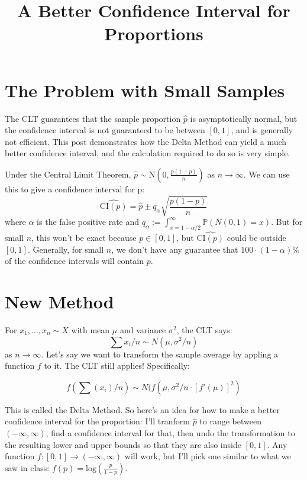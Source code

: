 \documentclass{article}
\title{A Better Confidence Interval for Proportions}
\author{}
\date{}
\begin{document}
\maketitle 

\section*{The Problem with Small Samples}

The CLT guarantees that the sample proportion $\hat{p}$ is asymptotically normal, but the confidence interval is not guaranteed to be between $[0, 1]$, and is generally not efficient. This post demonstrates how the Delta Method can yield a much better confidence interval, and the calculation required to do so is very simple.

Under the Central Limit Theorem, $\hat{p} \sim \text{N}(0, \frac{p(1-p)}{n})$ as $n\rightarrow\infty$. We can use this to give a confidence interval for p: $$\widehat{\text{CI}(p)}=\hat{p} \pm q_\alpha\sqrt{\frac{p(1-p)}{n}}$$ where $\alpha$ is the false positive rate and $q_\alpha:=\int_{x=1-\alpha/2}^\infty \mathbb{P}(N(0, 1) = x)$. But for small $n$, this won't be exact because $p\in [0, 1]$, but $\widehat{\text{CI}(p)}$ could be outside $[0, 1]$. Generally, for small $n$, we don't have any guarantee that $100\cdot(1-\alpha)\%$ of the confidence intervals will contain $p$.

\section*{New Method}

For $x_1, ..., x_n \sim X$ with mean $\mu$ and variance $\sigma^2$, the CLT says: $$\sum x_i/n \sim N(\mu, \sigma^2/n)$$ as $n\rightarrow \infty$. Let's say we want to transform the sample average by appling a function $f$ to it. The CLT still applies! Specifically:

$$f(\sum (x_i)/n) \sim N(f(\mu,\sigma^2/n\cdot \left[f'(\mu)\right]^2)$$

This is called the Delta Method. So here's an idea for how to make a better confidence interval for the proportion: I'll tranform $\hat{p}$ to range between $(-\infty, \infty)$, find a confidence interval for that, then undo the transformation to the resulting lower and upper bounds so that they are also inside $[0, 1]$. Any function $f: [0, 1] \rightarrow (-\infty, \infty)$ will work, but I'll pick one similar to what we saw in class: $f(p)=\text{log}(\frac{p}{1-p})$.
\end{document}
